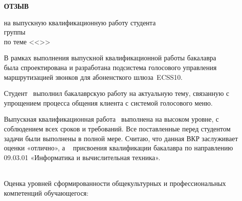 
\vspace{0.1cm}
\begin{center}
    \LARGE
    {\bf ОТЗЫВ} \\
    \normalsize
\end{center}
\begin{center}
    на выпускную квалификационную работу студента \\
    группы \group\ \fio \\
    по теме <<\topicname>>
\end{center}

В рамках выполнения выпускной квалификационной работы бакалавра \\ \fioa
была спроектирована и разработана подсистема голосового управления
маршрутизацией звонков для абоненсткого шлюза~ECSS10.

Студент \fio~выполнил бакалаврскую работу на актуальную тему, связанную с
упрощением процесса общения клиента с системой голосового меню.

Выпускная квалификационная работа \fio\ выполнена на высоком уровне, с соблюдением
всех сроков и требований. Все поставленные перед студентом задачи были выполнены
в полной мере. Считаю, что данная ВКР заслуживает оценки «отлично», а \fio~
присвоения квалификации бакалавра по направлению 09.03.01 «Информатика и вычислительная техника».

\hfill \\

Оценка уровней сформированности общекультурных и профессиональных
компетенций обучающегося:

